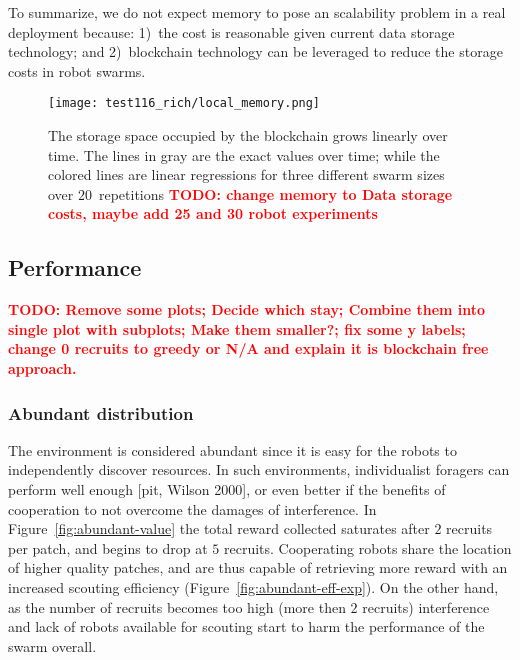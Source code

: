 \documentclass[runningheads]{llncs}
\newcommand{\todo}[1]{\textcolor{red}{\textbf{TODO: #1}}}
\begin{document}
To summarize, we do not expect memory to pose an scalability problem in a real deployment because: 1)~the cost is reasonable given current data storage technology; and 2)~blockchain technology can be leveraged to reduce the storage costs in robot swarms.

\begin{figure}
  \centering
  \texttt{[image: test116\_rich/local\_memory.png]}
  \caption{The storage space occupied by the blockchain grows linearly over time. The lines in gray are the exact values over time; while the colored lines are linear regressions for three different swarm sizes over $20$~repetitions \todo{change memory to Data storage costs, maybe add 25 and 30 robot experiments}} 
  \label{fig:data-storage}
\end{figure}



\subsection{Performance}
\label{subsec:performance}

\todo{Remove some plots; Decide which stay; Combine them into single plot with subplots; Make them smaller?; fix some y labels; change 0 recruits to greedy or N/A and explain it is blockchain free approach.}

\subsubsection{Abundant distribution}

The environment is considered abundant since it is easy for the robots to independently discover resources. In such environments, individualist foragers can perform well enough [pit, Wilson 2000], or even better if the benefits of cooperation to not overcome the damages of interference. In Figure~\ref{fig:abundant-value} the total reward collected saturates after $2$ recruits per patch, and begins to drop at $5$ recruits. Cooperating robots share the location of higher quality patches, and are thus capable of retrieving more reward with an increased scouting efficiency (Figure~\ref{fig:abundant-eff-exp}). On the other hand, as the number of recruits becomes too high (more then $2$ recruits) interference and lack of robots available for scouting start to harm the performance of the swarm overall.
\end{document}
